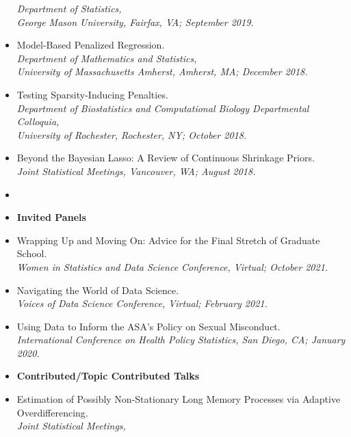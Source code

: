 \documentclass[11pt]{article}
\newcommand{\tab}{\hspace*{2em}}
\begin{document}
\begin{itemize}
	\tab \emph{Department of Statistics,}\\ 
	\tab \emph{George Mason University, Fairfax, VA; September 2019.} \vspace{-2mm}
	\item[] Model-Based Penalized Regression. \\
	\tab \emph{Department of Mathematics and Statistics,}\\ 
	\tab \emph{University of Massachusetts Amherst, Amherst, MA; December 2018.} \vspace{-2mm}
	\item[] Testing Sparsity-Inducing Penalties. \\
	\tab \emph{Department of Biostatistics and Computational Biology Departmental Colloquia,}\\ 
	\tab \emph{University of Rochester, Rochester, NY; October 2018.} \vspace{-2mm}
	\item[] Beyond the Bayesian Lasso: A Review of Continuous Shrinkage Priors. \\
	\tab \emph{Joint Statistical Meetings, Vancouver, WA; August 2018.} \vspace{-2mm}
	\item[]
	\item[] \textbf{Invited Panels} \vspace{-2mm}
	\item[] Wrapping Up and Moving On: Advice for the Final Stretch of Graduate School. \\
	\tab \emph{Women in Statistics and Data Science Conference, Virtual; October 2021.} \vspace{-2mm}
	\item[] Navigating the World of Data Science. \\
	\tab \emph{Voices of Data Science Conference, Virtual; February 2021.} \vspace{-2mm}
	\item[] Using Data to Inform the ASA's Policy on Sexual Misconduct. \\
	\tab \emph{International Conference on Health Policy Statistics, San Diego, CA; January 2020.} \vspace{-2mm}
	\item[] \textbf{Contributed/Topic Contributed Talks} \vspace{-2mm}
	\item[] Estimation of Possibly Non-Stationary Long Memory Processes via Adaptive Overdifferencing. \\
	\tab \emph{Joint Statistical Meetings,} \\

\end{itemize}
\end{document}

